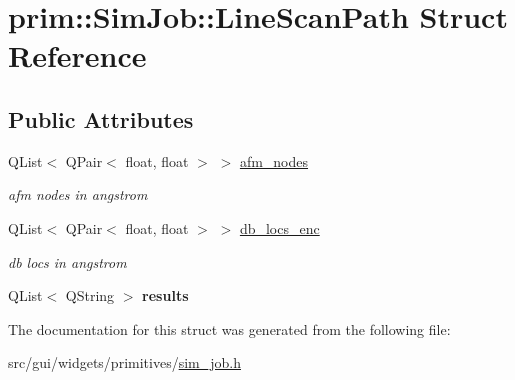 \hypertarget{structprim_1_1SimJob_1_1LineScanPath}{}\section{prim\+:\+:Sim\+Job\+:\+:Line\+Scan\+Path Struct Reference}
\label{structprim_1_1SimJob_1_1LineScanPath}
\subsection*{Public Attributes}
\begin{DoxyCompactItemize}
\item 
Q\+List$<$ Q\+Pair$<$ float, float $>$ $>$ \hyperlink{structprim_1_1SimJob_1_1LineScanPath_a05b131c82494c617e43143bdcb50a966}{afm\+\_\+nodes}\hypertarget{structprim_1_1SimJob_1_1LineScanPath_a05b131c82494c617e43143bdcb50a966}{}\label{structprim_1_1SimJob_1_1LineScanPath_a05b131c82494c617e43143bdcb50a966}

\begin{DoxyCompactList}\small\item\em afm nodes in angstrom \end{DoxyCompactList}\item 
Q\+List$<$ Q\+Pair$<$ float, float $>$ $>$ \hyperlink{structprim_1_1SimJob_1_1LineScanPath_ae5ec91249d6e21ad36497573e42e504a}{db\+\_\+locs\+\_\+enc}\hypertarget{structprim_1_1SimJob_1_1LineScanPath_ae5ec91249d6e21ad36497573e42e504a}{}\label{structprim_1_1SimJob_1_1LineScanPath_ae5ec91249d6e21ad36497573e42e504a}

\begin{DoxyCompactList}\small\item\em db locs in angstrom \end{DoxyCompactList}\item 
Q\+List$<$ Q\+String $>$ {\bfseries results}\hypertarget{structprim_1_1SimJob_1_1LineScanPath_a42b4d62004b975802cb7e22782fd42d3}{}\label{structprim_1_1SimJob_1_1LineScanPath_a42b4d62004b975802cb7e22782fd42d3}

\end{DoxyCompactItemize}


The documentation for this struct was generated from the following file\+:\begin{DoxyCompactItemize}
\item 
src/gui/widgets/primitives/\hyperlink{sim__job_8h}{sim\+\_\+job.\+h}\end{DoxyCompactItemize}
